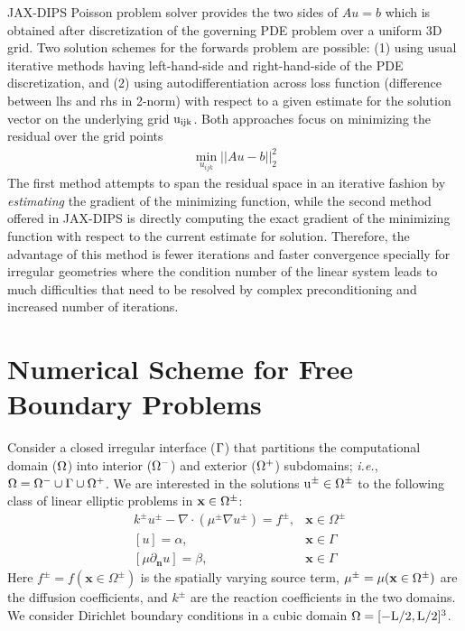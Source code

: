 \documentclass{elsarticle}
\begin{document}
JAX-DIPS Poisson problem solver provides the two sides of $A u =b$ which is obtained after discretization of the governing PDE problem over a uniform 3D grid. Two solution schemes for the forwards problem are possible: (1) using usual iterative methods having left-hand-side and right-hand-side of the PDE discretization, and (2) using autodifferentiation across loss function (difference between lhs and rhs in 2-norm) with respect to a given estimate for the solution vector on the underlying grid $\rm u_{ijk}$. Both approaches focus on minimizing the residual over the grid points 
\begin{align*}
\min_{u_{ijk}} \vert\vert Au -b \vert \vert^2_2
\end{align*}
The first method attempts to span the residual space in an iterative fashion by \textit{estimating} the gradient of the minimizing function, while the second method offered in JAX-DIPS is directly computing the exact gradient of the minimizing function with respect to the current estimate for solution. Therefore, the advantage of this method is fewer iterations and faster convergence specially for irregular geometries where the condition number of the linear system leads to much difficulties that need to be resolved by complex preconditioning and increased number of iterations.



\section{Numerical Scheme for Free Boundary Problems}
Consider a closed irregular interface ($\rm \Gamma$) that partitions the computational domain ($\rm \Omega$) into interior ($\rm \Omega^-$) and exterior ($\rm \Omega^+$) subdomains; \textit{i.e.}, $\rm \Omega=\Omega^- \cup \Gamma \cup \Omega^+$. We are interested in the solutions $\rm u^\pm\in \Omega^\pm$ to the following class of linear elliptic problems in  $\rm \mathbf{x}\in\Omega^\pm$:
\begin{align*}
&k^{\pm}u^{\pm} - \nabla \cdot (\mu^{\pm}\nabla u^\pm)=f^{\pm}, & \mathbf{x}\in\Omega^\pm\\
&[u]=\alpha, & \mathbf{x} \in \Gamma\\
&[\mu \partial_{\mathbf{n}}u]=\beta, & \mathbf{x} \in \Gamma
\end{align*}
Here $f^\pm=f(\mathbf{x} \in \Omega^\pm)$ is the spatially varying source term, $\rm \mu^\pm=\mu(\mathbf{x} \in \Omega^\pm)$  are the diffusion coefficients, and $k^\pm$ are the reaction coefficients in the two domains. We consider Dirichlet boundary conditions in a cubic domain $\rm \Omega=[-L/2,L/2]^3$.
\end{document}
